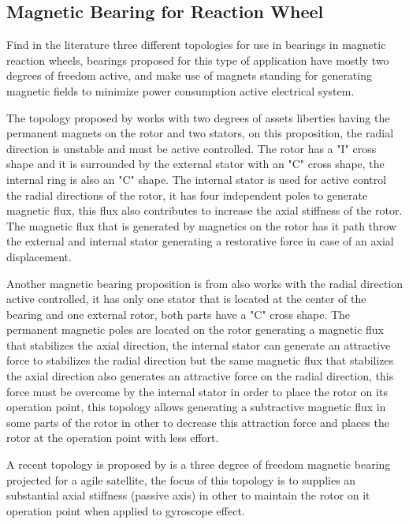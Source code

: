 \documentclass[10pt,fleqn,a4paper,twoside]{article}
\begin{document}
	\subsection{Magnetic Bearing for Reaction Wheel}
	
	Find in the literature three different topologies for use in bearings in magnetic reaction wheels, bearings proposed for this type of application have mostly two degrees of freedom active, and make use of magnets standing for generating magnetic fields to minimize power consumption active electrical system. 
	
	The topology proposed by \cite{Bernus1998} works with two degrees of assets liberties having the permanent magnets on the rotor and two stators, on this proposition, the radial direction is unstable and must be active controlled. The rotor has a "I" cross shape and it is surrounded by the external stator with an "C" cross shape, the internal ring is also an "C" shape. The internal stator is used for active control the radial directions of the rotor, it has four independent poles to generate magnetic flux, this flux also contributes to increase the axial stiffness of the rotor. The magnetic flux that is generated by magnetics on the rotor has it path throw the external and internal stator generating a restorative force in case of an axial displacement. 
	
	Another magnetic bearing proposition is from \cite{Scharfe2001} also works with the radial direction active controlled, it has only one stator that is located at the center of the bearing and one external rotor, both parts have a "C" cross shape. The permanent magnetic poles are located on the rotor generating a magnetic flux that stabilizes the axial direction, the internal stator can generate an attractive force to stabilizes the radial direction but the same magnetic flux that stabilizes the axial direction also generates an attractive force on the radial direction, this force must be overcome by the internal stator in order to place the rotor on its operation point, this topology allows generating a subtractive magnetic flux in some parts of the rotor in other to decrease this attraction force and places the rotor at the operation point with less effort. 
	
	A recent topology is proposed by \cite{Bangcheng2012} is a three degree of freedom magnetic bearing projected for a agile satellite, the focus of this topology is to supplies an substantial axial stiffness (passive axis) in other to maintain the rotor on it operation point when applied to  gyroscope effect.
	
\end{document}
